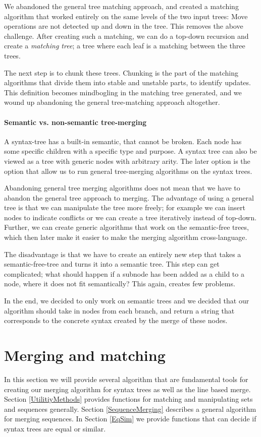 \documentclass[11pt]{article}
\begin{document}
We abandoned the general tree matching approach, and created a matching algorithm that worked entirely on the same levels of the two input trees: Move operations are not detected up and down in the tree. This removes the above challenge. After creating such a matching, we can do a top-down recursion and create a \textit{matching tree}; a tree where each leaf is a matching between the three trees. 

The next step is to chunk these trees. Chunking is the part of the matching algorithms that divide them into stable and unstable parts, to identify updates. This definition becomes mindbogling in the matching tree generated, and we wound up abandoning the general tree-matching approach altogether.
 
\paragraph{Semantic vs. non-semantic tree-merging} A syntax-tree has a built-in semantic, that cannot be broken. Each node has some specific children with a specific type and purpose. A syntax tree can also be viewed as a tree with generic nodes with arbitrary arity. The later option is the option that allow us to run general tree-merging algorithms on the syntax trees.

Abandoning general tree merging algorithms does not mean that we have to abandon the general tree approach to merging. The advantage of using a general tree is that we can manipulate the tree more freely; for example we can insert nodes to indicate conflicts or we can create a tree iteratively instead of top-down. Further, we can create generic algorithms that work on the semantic-free trees, which then later make it easier to make the merging algorithm cross-language.

The disadvantage is that we have to create an entirely new step that takes a semantic-free-tree and turns it into a semantic tree. This step can get complicated; what should happen if a subnode has been added as a child to a node, where it does not fit semantically? This again, creates few problems.

In the end, we decided to only work on semantic trees and we decided that our algorithm should take in nodes from each branch, and return a string that corresponds to the concrete syntax created by the merge of these nodes.

\clearpage

\section{Merging and matching}
In this section we will provide several algorithm that are fundamental tools for creating our merging algorithm for syntax trees as well as the line based merge. Section \ref{UtilitiyMethods} provides functions for matching and manipulating sets and sequences generally. Section \ref{SequenceMerging} describes a general algorithm for merging sequences.  In Section \ref{EqSim} we provide functions that can decide if syntax trees are equal or similar.
\end{document}
